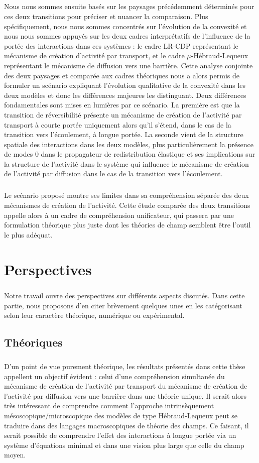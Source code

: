 \subparagraph{}Nous nous sommes ensuite basés sur les paysages précédemment déterminés pour ces deux transitions pour préciser et nuancer la comparaison. Plus spécifiquement, nous nous sommes concentrés sur l'évolution de la convexité et nous nous sommes appuyés sur les deux cadres interprétatifs de l'influence de la portée des interactions dans ces systèmes : le cadre LR-CDP représentant le mécanisme de création d'activité par transport, et le cadre $\mu$-Hébraud-Lequeux représentant le mécanisme de diffusion vers une barrière. Cette analyse conjointe des deux paysages et comparée aux cadres théoriques nous a alors permis de formuler un scénario expliquant l'évolution qualitative de la convexité dans les deux modèles et donc les différences majeures les distinguant. Deux différences fondamentales sont mises en lumières par ce scénario. La première est que la transition de réversibilité présente un mécanisme de création de l'activité par transport à courte portée uniquement alors qu'il s'étend, dans le cas de la transition vers l'écoulement, à longue portée. La seconde vient de la structure spatiale des interactions dans les deux modèles, plus particulièrement la présence de modes 0 dans le propagateur de redistribution élastique et ses implications sur la structure de l'activité dans le système qui influence le mécanisme de création de l'activité par diffusion dans le cas de la transition vers l'écoulement.

\subparagraph{}Le scénario proposé montre ses limites dans sa compréhension séparée des deux mécanismes de création de l'activité. Cette étude comparée des deux transitions appelle alors à un cadre de compréhension unificateur, qui passera par une formulation théorique plus juste dont les théories de champ semblent être l'outil le plus adéquat.

\section*{Perspectives}

\subparagraph{}Notre travail ouvre des perspectives sur différents aspects discutés. Dans cette partie, nous proposons d'en citer brèvement quelques unes en les catégorisant selon leur caractère théorique, numérique ou expérimental.

\subsection*{Théoriques}

\subparagraph{}D'un point de vue purement théorique, les résultats présentés dans cette thèse appellent un objectif évident : celui d'une compréhension simultanée du mécanisme de création de l'activité par transport du mécanisme de création de l'activité par diffusion vers une barrière dans une théorie unique. Il serait alors très intéressant de comprendre comment l'approche intrinsèquement mésoscopique/microscopique des modèles de type Hébraud-Lequeux peut se traduire dans des langages macroscopiques de théorie des champs. Ce faisant, il serait possible de comprendre l'effet des interactions à longue portée via un système d'équations minimal et dans une vision plus large que celle du champ moyen.

